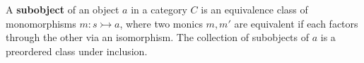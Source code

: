 A \textbf{subobject} of an object $a$ in a category $C$ is an equivalence class of monomorphisms $m: s \rightarrowtail a$, where two monics $m, m'$ are equivalent if each factors through the other via an isomorphism. The collection of subobjects of $a$ is a preordered class under inclusion.